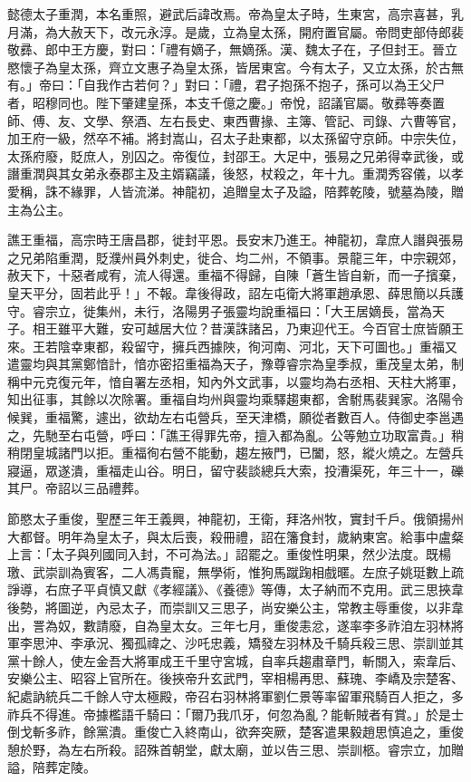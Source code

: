 \begin{pinyinscope}
 懿德太子重潤，本名重照，避武后諱改焉。帝為皇太子時，生東宮，高宗喜甚，乳月滿，為大赦天下，改元永淳。是歲，立為皇太孫，開府置官屬。帝問吏部侍郎裴敬彞、郎中王方慶，對曰：「禮有嫡子，無嫡孫。漢、魏太子在，子但封王。晉立愍懷子為皇太孫，齊立文惠子為皇太孫，皆居東宮。今有太子，又立太孫，於古無有。」帝曰：「自我作古若何？」對曰：「禮，君子抱孫不抱子，孫可以為王父尸者，昭穆同也。陛下肇建皇孫，本支千億之慶。」帝悅，詔議官屬。敬彞等奏置師、傅、友、文學、祭酒、左右長史、東西曹掾、主簿、管記、司錄、六曹等官，加王府一級，然卒不補。將封嵩山，召太子赴東都，以太孫留守京師。中宗失位，太孫府廢，貶庶人，別囚之。帝復位，封邵王。大足中，張易之兄弟得幸武後，或譖重潤與其女弟永泰郡主及主婿竊議，後怒，杖殺之，年十九。重潤秀容儀，以孝愛稱，誅不緣罪，人皆流涕。神龍初，追贈皇太子及謚，陪葬乾陵，號墓為陵，贈主為公主。



 譙王重福，高宗時王唐昌郡，徙封平恩。長安末乃進王。神龍初，韋庶人譖與張易之兄弟陷重潤，貶濮州員外刺史，徙合、均二州，不領事。景龍三年，中宗親郊，赦天下，十惡者咸宥，流人得還。重福不得歸，自陳「蒼生皆自新，而一子擯棄，皇天平分，固若此乎！」不報。韋後得政，詔左屯衛大將軍趙承恩、薛思簡以兵護守。睿宗立，徙集州，未行，洛陽男子張靈均說重福曰：「大王居嫡長，當為天子。相王雖平大難，安可越居大位？昔漢誅諸呂，乃東迎代王。今百官士庶皆願王來。王若陰幸東都，殺留守，擁兵西據陜，徇河南、河北，天下可圖也。」重福又遣靈均與其黨鄭愔計，愔亦密招重福為天子，豫尊睿宗為皇季叔，重茂皇太弟，制稱中元克復元年，愔自署左丞相，知內外文武事，以靈均為右丞相、天柱大將軍，知出征事，其餘以次除署。重福自均州與靈均乘驛趨東都，舍駙馬裴巽家。洛陽令候巽，重福驚，遽出，欲劫左右屯營兵，至天津橋，願從者數百人。侍御史李邕遇之，先馳至右屯營，呼曰：「譙王得罪先帝，擅入都為亂。公等勉立功取富貴。」稍稍閉皇城諸門以拒。重福徇右營不能動，趨左掖門，已闔，怒，縱火燒之。左營兵寢逼，眾遂潰，重福走山谷。明日，留守裴談總兵大索，投漕渠死，年三十一，礫其尸。帝詔以三品禮葬。



 節愍太子重俊，聖歷三年王義興，神龍初，王衛，拜洛州牧，實封千戶。俄領揚州大都督。明年為皇太子，與太后喪，殺冊禮，詔在籓食封，歲納東宮。給事中盧粲上言：「太子與列國同入封，不可為法。」詔罷之。重俊性明果，然少法度。既楊璬、武崇訓為賓客，二人馮貴寵，無學術，惟狗馬蹴踘相戲暱。左庶子姚珽數上疏諍導，右庶子平貞慎又獻《孝經議》、《養德》等傳，太子納而不克用。武三思挾韋後勢，將圖逆，內忌太子，而崇訓又三思子，尚安樂公主，常教主辱重俊，以非韋出，詈為奴，數請廢，自為皇太女。三年七月，重俊恚忿，遂率李多祚洎左羽林將軍李思沖、李承況、獨孤禕之、沙吒忠義，矯發左羽林及千騎兵殺三思、崇訓並其黨十餘人，使左金吾大將軍成王千里守宮城，自率兵趨肅章門，斬關入，索韋后、安樂公主、昭容上官所在。後挾帝升玄武門，宰相楊再思、蘇瑰、李嶠及宗楚客、紀處訥統兵二千餘人守太極殿，帝召右羽林將軍劉仁景等率留軍飛騎百人拒之，多祚兵不得進。帝據檻語千騎曰：「爾乃我爪牙，何忽為亂？能斬賊者有賞。」於是士倒戈斬多祚，餘黨潰。重俊亡入終南山，欲奔突厥，楚客遣果毅趙思慎追之，重俊憩於野，為左右所殺。詔殊首朝堂，獻太廟，並以告三思、崇訓柩。睿宗立，加贈謚，陪葬定陵。




\end{pinyinscope}
